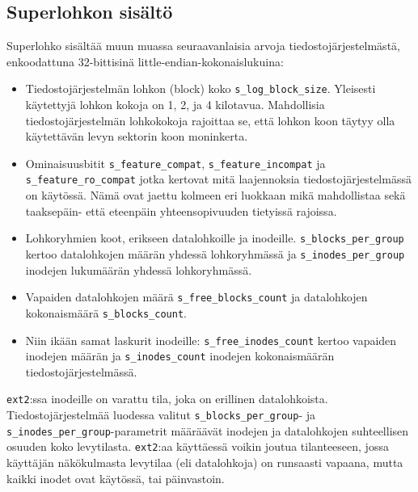 \subsection{Superlohkon sisältö}
Superlohko sisältää muun muassa seuraavanlaisia arvoja tiedostojärjestelmästä, enkoodattuna 32-bittisinä little-endian-kokonaislukuina:
\begin{itemize}
    \item Tiedostojärjestelmän lohkon (block) koko \texttt{s\_log\_block\_size}. Yleisesti käytettyjä lohkon kokoja on 1, 2, ja 4 kilotavua.
          Mahdollisia tiedostojärjestelmän lohkokokoja rajoittaa se, että lohkon koon täytyy olla käytettävän levyn sektorin koon moninkerta.
    \item Ominaisuusbitit \texttt{s\_\-feature\_\-compat}, \texttt{s\_\-feature\_\-incompat} ja \texttt{s\_feature\_\-ro\_\-compat} jotka kertovat mitä laajennoksia tiedostojärjestelmässä on käytössä.
          Nämä ovat jaettu kolmeen eri luokkaan mikä mahdollistaa sekä taaksepäin- että eteenpäin yhteensopivuuden tietyissä rajoissa.
    \item Lohkoryhmien koot, erikseen datalohkoille ja inodeille.
          \texttt{s\_\-blocks\_\-per\_\-group} kertoo datalohkojen määrän yhdessä lohkoryhmässä ja \texttt{s\_inodes\_\-per\_\-group} inodejen lukumäärän yhdessä lohkoryhmässä.
    \item Vapaiden datalohkojen määrä \texttt{s\_\-free\_\-blocks\_\-count} ja datalohkojen kokonaismäärä \texttt{s\_\-blocks\_\-count}.
    \item Niin ikään samat laskurit inodeille: \texttt{s\_free\_\-inodes\_\-count} kertoo vapaiden inodejen määrän ja \texttt{s\_inodes\_count} inodejen kokonaismäärän tiedostojärjestelmässä.
\end{itemize}
%
\texttt{ext2}:ssa inodeille on varattu tila,
joka on erillinen datalohkoista.
Tiedostojärjestelmää luodessa valitut \texttt{s\_blocks\_\-per\_\-group}- ja \texttt{s\_inodes\_\-per\_\-group}-parametrit määräävät inodejen ja datalohkojen suhteellisen osuuden koko levytilasta.
\texttt{ext2}:aa käyttäessä voikin joutua tilanteeseen, jossa käyttäjän näkökulmasta levytilaa (eli datalohkoja) on runsaasti vapaana, mutta kaikki inodet ovat käytössä, tai päinvastoin.


